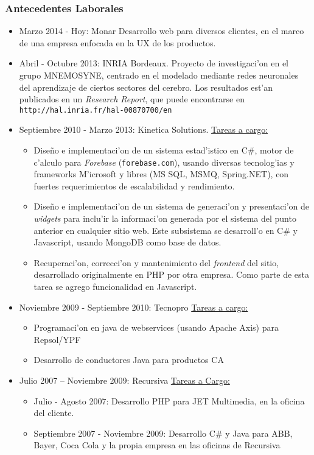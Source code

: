 \subsubsection*{Antecedentes Laborales}
\begin{itemize}
	\item Marzo 2014 - Hoy: Monar
		\subitem Desarrollo web para diversos clientes, en el marco de una empresa enfocada en la UX
		de los productos.
	\item Abril - Octubre 2013: INRIA Bordeaux.
		\subitem Proyecto de investigaci'on en el grupo MNEMOSYNE, centrado en el modelado mediante
		redes neuronales del aprendizaje de ciertos sectores del cerebro.  Los resultados est'an
		publicados en un \emph{Research Report}, que puede encontrarse en
		\texttt{http://hal.inria.fr/hal-00870700/en}
	\item Septiembre 2010 - Marzo 2013: Kinetica Solutions.
		\subitem \underline{Tareas a cargo:}
		\begin{itemize}
			\item Dise\~no e implementaci'on de un sistema estad'istico en C\#,
				motor de c'alculo para \emph{Forebase} (\texttt{forebase.com}), usando
				diversas tecnolog'ias y frameworks M'icrosoft y libres (MS SQL, MSMQ,
				Spring.NET), con fuertes requerimientos de escalabilidad y rendimiento.
			\item Dise\~no e implementaci'on de un sistema de generaci'on y presentaci'on
				de \emph{widgets} para inclu'ir la informaci'on generada por el sistema del
				punto anterior en cualquier sitio web.  Este subsistema se desarroll'o en C\# y
				Javascript, usando MongoDB como base de datos.
			\item Recuperaci'on, correcci'on y mantenimiento del \emph{frontend} del sitio,
				desarrollado originalmente en PHP por otra empresa.  Como parte de esta tarea se
				agrego funcionalidad en Javascript.
		\end{itemize}
	\item Noviembre 2009 - Septiembre 2010: Tecnopro
		\subitem \underline{Tareas a cargo:}
		\begin{itemize}
			\item Programaci'on en java de webservices (usando Apache Axis) para Repsol/YPF
			\item Desarrollo de conductores Java para productos CA
		\end{itemize}
	\item Julio 2007 -- Noviembre 2009: Recursiva
		\subitem \underline{Tareas a Cargo:}
			\begin{itemize}
				\item Julio - Agosto 2007: Desarrollo PHP para JET Multimedia,
					en la oficina del cliente.
				\item Septiembre 2007 - Noviembre 2009: Desarrollo C\# y Java para ABB,
					Bayer, Coca Cola y la propia empresa en las oficinas de
					Recursiva
			\end{itemize}


\end{itemize}
